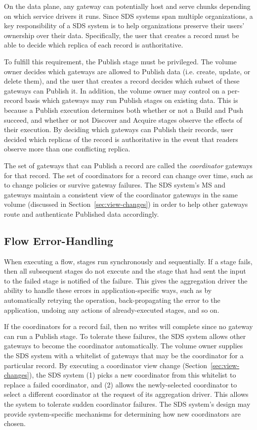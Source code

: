 On the data plane, any gateway can potentially host and serve chunks depending
on which service drivers it runs.
Since SDS systems span multiple organizations, a key responsibility of a SDS
system is to help organizations preserve their users' ownership over their 
data.  Specifically, the user that creates a record
must be able to decide which replica of each record is authoritative.

To fulfill this requirement, the Publish stage must be privileged.  The volume owner decides
which gateways are allowed to Publish data (i.e. create, update, or delete
them), and the user that creates a
record decides which subset of these gateways can Publish it.
In addition, the volume owner may control on a
per-record basis which gateways may run Publish stages on existing data.
This is because a Publish
execution determines both whether or not a Build and Push succeed, and
whether or not Discover and Acquire stages observe the effects of their
execution.  By deciding which gateways can Publish their records,
user decided which replicas of the record is authoritative in the event that
readers observe more than one conflicting replica.

The set of gateways that can Publish a record are called the \emph{coordinator}
gateways for that record.
The set of coordinators for a record can change over time, such as to change
policies or survive gateway failures.  The SDS system's MS and gateways
maintain a consistent view of the coordinator gateways in the same volume
(discussed in Section~\ref{sec:view-changes}) in order to help other gateways
route and authenticate Published data accordingly.

\subsection{Flow Error-Handling}
\label{sec:flow-error-handling}

When executing a flow, stages run synchronously and sequentially.
If a stage fails, then all subsequent stages do not execute
and the stage that had sent the input to the
failed stage is notified of the failure.  This gives the aggregation driver
the ability to handle these errors in application-specific ways, such as by
automatically retrying the operation, back-propagating the error to the application, 
undoing any actions of already-executed stages, and so on.

If the coordinators for a record fail, then no writes will complete since no
gateway can run a Publish stage.  To
tolerate these failures, the SDS system allows other gateways to
become the coordinator automatically.  The volume owner supplies the SDS system with a
whitelist of gateways that may be the coordinator for a particular record.
By executing a coordinator view change (Section~\ref{sec:view-changes}), the SDS
system (1) picks a new coordinator from this
whitelist to replace a failed coordinator, and (2) allows the newly-selected coordinator
to select a different coordinator at the request of its aggregation driver.
This allows the system to tolerate sudden coordinator failures.  The SDS system's
design may provide system-specific mechanisms for determining how new
coordinators are chosen.

